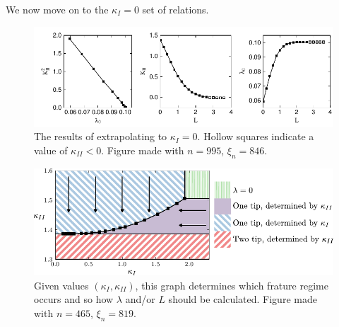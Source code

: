 \documentclass{jfm}
\begin{document}
We now move on to the $\kappa_I=0$ set of relations.
\begin{figure}
 \centerline{
\includegraphics{./../../Graphs/KI-0.pdf}}
  \caption{The results of extrapolating to $\kappa_I = 0$. Hollow squares 
           indicate a value of $\kappa_{II} <0$. Figure 
           made with $n = 995$, $\xi_n = 846$.}
\end{figure}


\begin{figure}
 \centerline{
\includegraphics{./../../Graphs/catagory-edited.pdf}}
  \caption{Given values $(\kappa_I,\kappa_{II})$, this graph determines which
           frature regime occurs and so how $\lambda$ and/or $L$ should be 
           calculated. Figure made with $n=465$, $\xi_n = 819$.}
\end{figure}
\end{document}
